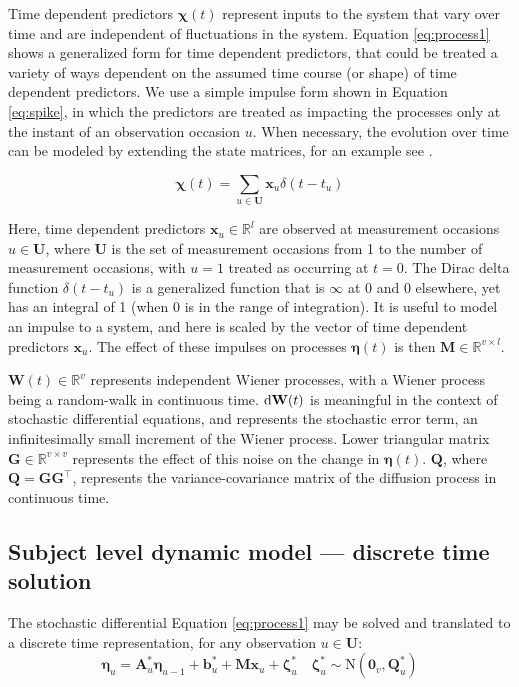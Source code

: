 \documentclass[nojss]{jss}\usepackage[]{graphicx}\usepackage[]{color}
\newcommand{\vect}[1]{\boldsymbol{\mathbf{#1}}}
\begin{document}
Time dependent predictors $\vect{\chi}(t)$ represent inputs to the system that vary over time and are independent of fluctuations in the system. Equation \ref{eq:process1} shows a generalized form for time dependent predictors, that could be treated a variety of ways dependent on the assumed time course (or shape) of time dependent predictors. We use a simple impulse form shown in Equation \ref{eq:spike}, in which the predictors are treated as impacting the processes only at the instant of an observation occasion $u$. When necessary, the evolution over time can be modeled by extending the state matrices, for an example see \citet{driverinpresscontinuous}.

\begin{equation}
\label{eq:spike}
\vect{\chi} (t) = \sum_{ u \in \vect{U}}  \vect{x}_{u} \delta (t-t_u)     
\end{equation}

Here, time dependent predictors $\vect{x}_u \in \mathbb{R}^{l}$ are observed at measurement occasions $ u \in \vect{U}$, where $\vect{U}$ is the set of measurement occasions from 1 to the number of measurement occasions, with $u = 1$ treated as occurring at $t = 0$. The Dirac delta function $\delta(t-t_u)$ is a generalized function that is $\infty$ at 0 and 0 elsewhere, yet has an integral of 1 (when 0 is in the range of integration). It is useful to model an impulse to a system, and here is scaled by the vector of time dependent predictors $\vect{x}_u$.  The effect of these impulses on processes $\vect{\eta}(t)$ is then $\vect{M}\in \mathbb{R}^{v \times l}$. 

$\vect{W}(t) \in \mathbb{R}^{v}$ represents independent Wiener processes, with a Wiener process being a random-walk in continuous time. $\textnormal{d}\vect{W}(t)$ is meaningful in the context of stochastic differential equations, and represents the stochastic error term, an infinitesimally small increment of the Wiener process. Lower triangular matrix $\vect{G} \in \mathbb{R}^{v \times v}$ represents the effect of this noise on the change in  $\vect{\eta}(t)$.  $\vect{Q}$, where $\vect{Q} = \vect{GG}^\top$, represents the variance-covariance matrix of the diffusion process in continuous time.

\subsection{Subject level dynamic model --- discrete time solution}
The stochastic differential Equation \ref{eq:process1} may be solved and translated to a discrete time representation, for any observation $u \in \vect{U}$:
\begin{equation}
	\label{eq:discreteprocess}
	\vect{\eta}_{u} =
	\vect{A}^*_u \vect{\eta}_{u-1} +
	\vect{b}^*_u +
	\vect{M} \vect{x}_u +
	\vect{\zeta}^*_u \quad \vect{\zeta}^*_u \sim \mathrm{N}(\vect{0}_v, \vect{Q}^*_u)
\end{equation}
\end{document}
